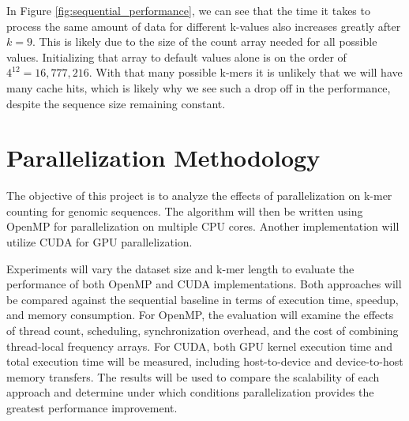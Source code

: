 \documentclass{article}
\begin{document}
In Figure \ref{fig:sequential_performance}, we can see that the time it takes to process the same amount of data for different k-values also increases greatly 
after $k=9$. This is likely due to the size of the count array needed for all possible values. Initializing that array to default values alone is on the 
order of $4^{12}= 16{,}777{,}216$. With that many possible k-mers it is unlikely that we will have many cache hits, which is likely why we see such a drop 
off in the performance, despite the sequence size remaining constant.

\vspace{\baselineskip}

\FloatBarrier

\FloatBarrier

\vspace{\baselineskip}


\section{Parallelization Methodology}

\vspace{\baselineskip}

The objective of this project is to analyze the effects of parallelization on k-mer counting for genomic sequences. 
The algorithm will then be written using OpenMP for parallelization on multiple CPU cores. Another implementation will utilize CUDA  
for GPU parallelization. 

\vspace{\baselineskip}


Experiments will vary the dataset size and k-mer length to evaluate the performance of both OpenMP and CUDA implementations.
Both approaches will be compared against the sequential baseline in terms of execution time, speedup, and memory consumption.
For OpenMP, the evaluation will examine the effects of thread count, scheduling, synchronization overhead, and the cost of
combining thread-local frequency arrays. For CUDA, both GPU kernel execution time and total execution time will be measured,
including host-to-device and device-to-host memory transfers. The results will be used to compare the scalability of each
approach and determine under which conditions parallelization provides the greatest performance improvement.


\vspace{\baselineskip}
\end{document}
